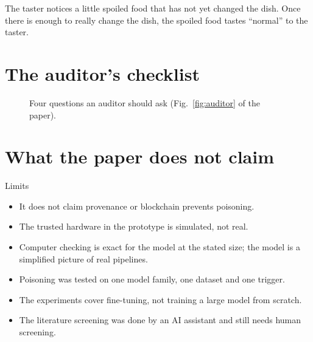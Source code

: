 \begin{analogy}
The taster notices a little spoiled food that has not yet changed the dish. Once there is
enough to really change the dish, the spoiled food tastes ``normal'' to the taster.
\end{analogy}

\section{The auditor's checklist}
\begin{figure}[h]
\centering
\resizebox{0.75\textwidth}{!}{}
\caption{Four questions an auditor should ask (Fig.~\ref{fig:auditor} of the paper).}
\end{figure}

\section{What the paper does not claim}
\begin{caution}{Limits}
\begin{itemize}
\item It does not claim provenance or blockchain prevents poisoning.
\item The trusted hardware in the prototype is simulated, not real.
\item Computer checking is exact for the model at the stated size; the model is a simplified
  picture of real pipelines.
\item Poisoning was tested on one model family, one dataset and one trigger.
\item The experiments cover fine-tuning, not training a large model from scratch.
\item The literature screening was done by an AI assistant and still needs human screening.
\end{itemize}
\end{caution}

